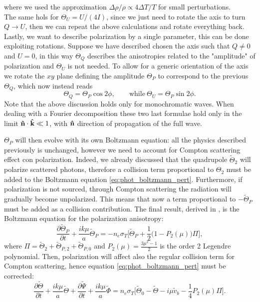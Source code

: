 where we used the approximation $\Delta\rho/\rho\propto4\Delta T/T$ for small perturbations.\\The same hols for $\Theta_U=U/(4I)$, since we just need to rotate the axis to turn $Q\rightarrow U$, then we can repeat the above calculations and rotate everything back.\\ Lastly, we want to describe polarization by a single parameter, this can be done exploiting rotations. Suppose we have described chosen the axis such that $Q\neq0$ and $U=0$, in this way $\Theta_Q$ describes the anisotropies related to the "amplitude" of polarization and $\Theta_U$ is not needed. To allow for a generic orientation of the axis we rotate the $xy$ plane defining the amplitude $\Theta_P$ to correspond to the previous $\Theta_Q$, which now instead reads
$$\Theta_Q=\Theta_P\cos2\phi,\qquad\text{while}\  \Theta_U=\Theta_P\sin2\phi.$$
Note that the above discussion holds only for monochromatic waves. When dealing with a Fourier decomposition these two last formulae hold only in the limit $\mathbf{\hat{n}}\cdot\mathbf{\hat{k}}\ll1$, with $\mathbf{\hat{n}}$ direction of propagation of the full wave.

$\Theta_P$ will then evolve with its own Boltzmann equation:
all the physics described previously is unchanged, however we need to account for Compton scattering effect con polarization. Indeed, we already discussed that the quadrupole $\tilde{\Theta}_2$ will polarize scattered photons, therefore a collision term proportional to $\Theta_2$ must be added to the Boltzmann equation \eqref{eq:phot_boltzmann_pert}. Furthermore, if polarization is not sourced, through Compton scattering the radiation will gradually become unpolarized. This means that now a term proportional to $-\tilde{\Theta}_P$ must be added as a collision contribution. The final result, derived in \cite{10.1093/mnras/226.3.655}, is the Boltzmann equation for the polarization anisotropy:
\begin{equation}\label{eq:ThetaP_Boltzmann}
    \frac{\partial \tilde\Theta_P}{\partial t}+\frac{ik\mu}{a}\tilde\Theta_P=-n_e\sigma_T\bigg[\tilde\Theta_{P}+\frac{1}{2}\bigg(1-P_2(\mu)\bigg)\Pi\bigg],
\end{equation}
where $\Pi=\tilde\Theta_2+\tilde\Theta_{P,2}+\tilde\Theta_{P,0}$ and $P_2(\mu)=\frac{3\mu^2-1}{2}$ is the order 2 Legendre polynomial.
Then, polarization will affect also the regular collision term for Compton scattering, hence equation \eqref{eq:phot_boltzmann_pert} must be corrected:
\begin{equation}\label{eq:phot_boltzmann_pert_pol}
    \frac{\partial \tilde\Theta}{\partial t} +\frac{ik\mu}{a}\tilde\Theta+\frac{\partial \tilde\Psi}{\partial t}+\frac{ik\mu}{a}\tilde\Phi=n_e \sigma_T\Bigg[\tilde\Theta_0-\tilde\Theta-i\mu\tilde v_b-\frac{1}{4}P_2(\mu)\Pi\Bigg].
\end{equation}
